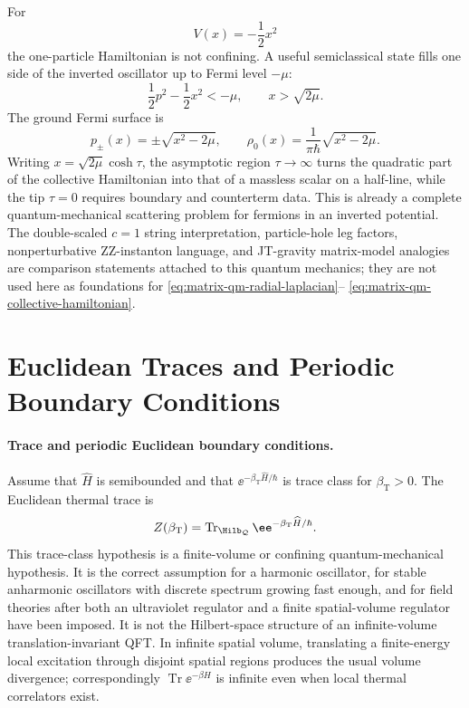 \begin{example}[Inverted oscillator and the \(c=1\) comparison boundary]
\label{ex:matrix-qm-inverted-oscillator-c1-boundary}
For
\[
  V(x)=-\frac12x^2
\]
the one-particle Hamiltonian is not confining.  A useful semiclassical state
fills one side of the inverted oscillator up to Fermi level \(-\mu\):
\[
  \frac12p^2-\frac12x^2<-\mu,\qquad x>\sqrt{2\mu}.
\]
The ground Fermi surface is
\begin{equation}
  p_\pm(x)=\pm\sqrt{x^2-2\mu},
  \qquad
  \rho_0(x)=\frac1{\pi\hbar}\sqrt{x^2-2\mu}.
  \label{eq:matrix-qm-inverted-density}
\end{equation}
Writing \(x=\sqrt{2\mu}\cosh\tau\), the asymptotic region
\(\tau\to\infty\) turns the quadratic part of the collective Hamiltonian into
that of a massless scalar on a half-line, while the tip
\(\tau=0\) requires boundary and counterterm data.  This is already a
complete quantum-mechanical scattering problem for fermions in an inverted
potential.  The double-scaled \(c=1\) string interpretation, particle-hole
leg factors, nonperturbative ZZ-instanton language, and JT-gravity
matrix-model analogies are comparison statements attached to this quantum
mechanics; they are not used here as foundations for
\eqref{eq:matrix-qm-radial-laplacian}--
\eqref{eq:matrix-qm-collective-hamiltonian}.
\end{example}

\section{Euclidean Traces and Periodic Boundary Conditions}

\paragraph{Trace and periodic Euclidean boundary conditions.}
Assume that \(\widehat H\) is semibounded and that
\(\ee^{-\beta_{\mathrm T}\widehat H/\hbar}\) is trace class for
\(\beta_{\mathrm T}>0\). The Euclidean thermal trace is
\[
  Z(\beta_{\mathrm T})
  =
  \operatorname{Tr}_{\Hilb_{\mathcal Q}}
  \ee^{-\beta_{\mathrm T}\widehat H/\hbar}.
\]
This trace-class hypothesis is a finite-volume or confining
quantum-mechanical hypothesis.  It is the correct assumption for a harmonic
oscillator, for stable anharmonic oscillators with discrete spectrum growing
fast enough, and for field theories after both an ultraviolet regulator and a
finite spatial-volume regulator have been imposed.  It is not the Hilbert-space
structure of an infinite-volume translation-invariant QFT.  In infinite
spatial volume, translating a finite-energy local excitation through disjoint
spatial regions produces the usual volume divergence; correspondingly
\(\operatorname{Tr}\ee^{-\beta H}\) is infinite even when local thermal
correlators exist.

